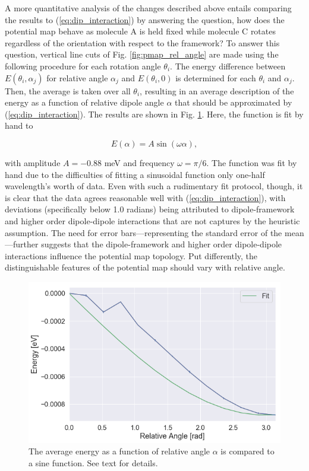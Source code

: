         A more quantitative analysis of the changes described above entails comparing the results to (\ref{eq:dip_interaction}) by answering the question, how does the potential map behave as molecule A is held fixed while molecule C rotates regardless of the orientation with respect to the framework? To answer this question, vertical line cuts of Fig. \ref{fig:pmap_rel_angle} are made using the following procedure for each rotation angle $\theta_i$. The energy difference between $E(\theta_i,\alpha_j)$ for relative angle $\alpha_j$ and $E(\theta_i,0)$ is determined for each $\theta_i$ and $\alpha_j$. Then, the average is taken over all $\theta_i$, resulting in an average description of the energy as a function of relative dipole angle $\alpha$ that should be approximated by (\ref{eq:dip_interaction}). The results are shown in Fig. \ref{fig:relative_angle_fit}. Here, the function is fit by hand to 
        
        \begin{equation}
            E(\alpha) = A \sin(\omega \alpha),
        \end{equation}
        
        \noindent with amplitude $A = -0.88$ meV and frequency $\omega = \pi/6$. The function was fit by hand due to the difficulties of fitting a sinusoidal function only one-half wavelength's worth of data. Even with such a rudimentary fit protocol, though, it is clear that the data agrees reasonable well with (\ref{eq:dip_interaction}), with deviations (specifically below 1.0 radians) being attributed to dipole-framework and higher order dipole-dipole interactions that are not captures by the heuristic assumption. The need for error bars---representing the standard error of the mean---further suggests that the dipole-framework and higher order dipole-dipole interactions influence the potential map topology. Put differently, the distinguishable features of the potential map should vary with relative angle.
        
        \begin{figure}
            \centering
            \includegraphics[width=0.9\linewidth]{Figures/System/relative_angle_fit.png}
            \caption{The average energy as a function of relative angle $\alpha$ is compared to a sine function. See text for details.}
            \label{fig:relative_angle_fit}
        \end{figure}
        
